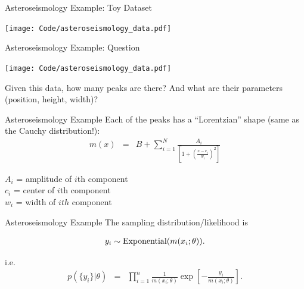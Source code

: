 \begin{frame}[t]{Asteroseismology Example: Toy Dataset}

\begin{center}
\texttt{[image: Code/asteroseismology\_data.pdf]}\\
\end{center}

\end{frame}


\begin{frame}[t]{Asteroseismology Example: Question}

\begin{center}
\texttt{[image: Code/asteroseismology\_data.pdf]}
\end{center}

Given this data, how many peaks are there? And what are their parameters
(position, height, width)?

\end{frame}



\begin{frame}[t]{Asteroseismology Example}
Each of the peaks has a ``Lorentzian'' shape
(same as the Cauchy distribution!):
\begin{eqnarray}
m(x) &=& B + \sum_{i=1}^N \frac{A_i}
{\left[1 + \left(\frac{x - c_i}{w_i}\right)^2\right]} 
\end{eqnarray}

$A_i$ = amplitude of $i$th component\\
$c_i$ = center of $i$th component\\
$w_i$ = width of $ith$ component\\


\end{frame}

\begin{frame}[t]{Asteroseismology Example}
The sampling distribution/likelihood is

\begin{eqnarray*}
y_i \sim \textnormal{Exponential}(m(x_i; \theta)).
\end{eqnarray*}

i.e.
\begin{eqnarray*}
p(\{y_i\} | \theta) &=& \prod_{i=1}^n \frac{1}{m(x_i; \theta)}
\exp\left[-\frac{y_i}{m(x_i; \theta)}\right].
\end{eqnarray*}
\end{frame}


